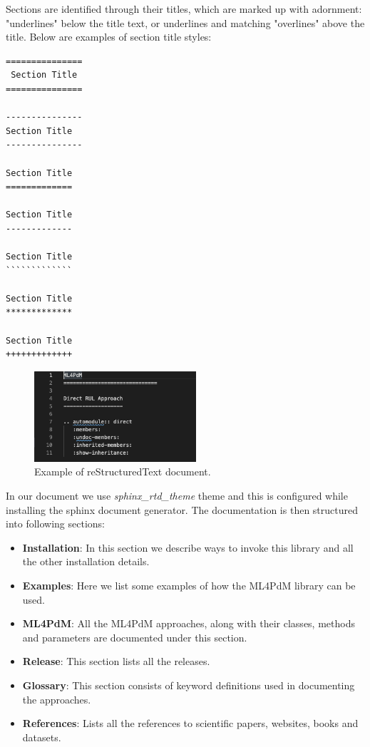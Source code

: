 Sections are identified through their titles, which are marked up with adornment: "underlines" below the title text, or underlines and matching "overlines" above the title.
Below are examples of section title styles:\begin{verbatim}
===============
 Section Title
===============

---------------
Section Title
---------------

Section Title
=============

Section Title
-------------

Section Title
`````````````

Section Title
*************

Section Title
+++++++++++++\end{verbatim}
\begin{figure}[H]
	\centering
	\includegraphics[width = 6cm]{gfx/ex_rst.png}
	\captionsetup{justification=centering}
	\caption{Example of reStructuredText document.}
	\label{fig:rst}
\end{figure}
In our document we use \textit{sphinx\_rtd\_theme} theme and this is configured while installing the sphinx document generator.
The documentation is then structured into following sections:
\begin{itemize}
	\item \textbf{Installation}: In this section we describe ways to invoke this library and all the other installation details.
	\item \textbf{Examples}: Here we list some examples of how the ML4PdM library can be used.
	\item \textbf{ML4PdM}: All the ML4PdM approaches, along with their classes, methods and parameters are documented under this section.
	\item \textbf{Release}: This section lists all the releases.
	\item \textbf{Glossary}: This section consists of keyword definitions used in documenting the approaches.
	\item \textbf{References}: Lists all the references to scientific papers, websites, books and datasets.
\end{itemize}
